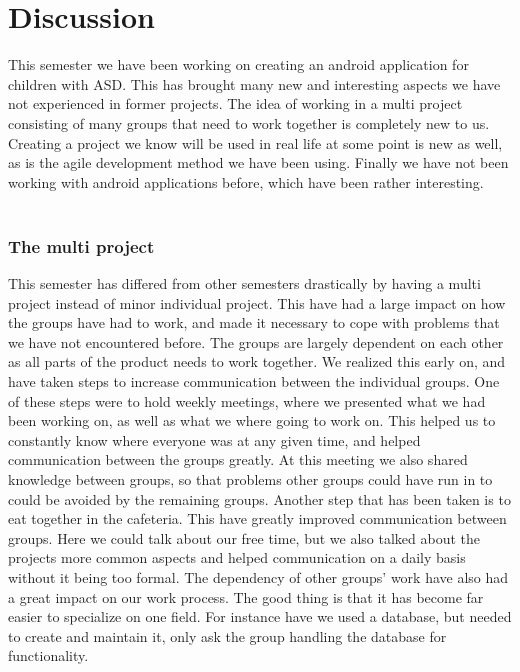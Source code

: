\chapter{Discussion}
 
This semester we have been working on creating an android application for children with ASD. 
This has brought many new and interesting aspects we have not experienced in former projects. 
The idea of working in a multi project consisting of many groups that need to work together is completely new to us. 
Creating a project we know will be used in real life at some point is new as well, as is the agile development method we have been using. Finally we have not been working with android applications before, which have been rather interesting.\\ 
\\
\subsection*{The multi project}
This semester has differed from other semesters drastically by having a multi project instead of minor individual project. 
This have had a large impact on how the groups have had to work, and made it necessary to cope with problems that we have not encountered before.\newline
The groups are largely dependent on each other as all parts of the product needs to work together. 
We realized this early on, and have taken steps to increase communication between the individual groups. 
One of these steps were to hold weekly meetings, where we presented what we had been working on, as well as what we where going to work on.\newline 
This helped us to constantly know where everyone was at any given time, and helped communication between the groups greatly. 
At this meeting we also shared knowledge between groups, so that problems other groups could have run in to could be avoided by the remaining groups.\newline
Another step that has been taken is to eat together in the cafeteria. This have greatly improved communication between groups. 
Here we could talk about our free time, but we also talked about the projects more common aspects and helped communication on a daily basis without it being too formal.\newline
The dependency of other groups' work have also had a great impact on our work process. 
The good thing is that it has become far easier to specialize on one field. 
For instance have we used a database, but needed to create and maintain it, only ask the group handling the database for functionality. 

